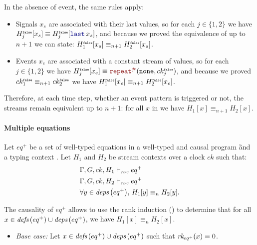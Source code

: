 \begin{skippableproof}
\begin{itemize}
              In the absence of event, the same rules apply:
              \begin{itemize}
                  \item Signals $x_s$ are associated with their last values, so for each $j \in \{1,
                            2\}$ we have $H^\F_j[x_s] \equiv H^\F_j[\last{x_s}]$, and because we
                        proved the equivalence of  up to $n+1$ we can state:  $H^\F_1[x_s]
                            \equiv_{n+1} H^\F_2[x_s]$.

                  \item Events $x_e$ are associated with a constant stream of \none values, so
                        for each $j \in \{1, 2\}$ we have $H^\F_j[x_e]\equiv\const{\none}{ck^\F_j}$,
                        and because we proved $ck^\F_1 \equiv_{n+1} ck^\F_2$ we have $H^\F_1[x_e]
                            \equiv_{n+1} H^\F_2[x_e]$.
              \end{itemize}

              Therefore, at each time step, whether an event pattern is triggered or not, the
              streams remain equivalent up to $n+1$: for all $x$ in  we
              have $H_1[x] \equiv_{n+1} H_2[x]$.
    \end{itemize}

    \paragraph{Multiple equations}
    Let $eq^+$ be a set of well-typed equations in a well-typed and causal program \G and a typing
    context \tyCtx. Let $H_1$ and $H_2$ be stream contexts over a clock $ck$ such that:
    \begin{align*}
         & \eqDenot{H_1}{ck}{eq^+}                               \\
         & \eqDenot{H_2}{ck}{eq^+}                               \\
         & \forall y \in \deps{eq^+}, \, H_1[y] \equiv_n H_2[y].
    \end{align*}

    The causality of $eq^+$ allows to use the rank induction
    () to
    determine that for all $x \in \defs{eq^+} \cup \deps{eq^+}$, we have
    $H_1[x] \equiv_n H_2[x]$.

    \begin{itemize}
        \item \textit{Base case:} Let $x \in \defs{eq^+} \cup \deps{eq^+}$ such that
              $\rank{eq^+}{x} = 0$.


\end{itemize}
\end{skippableproof}
